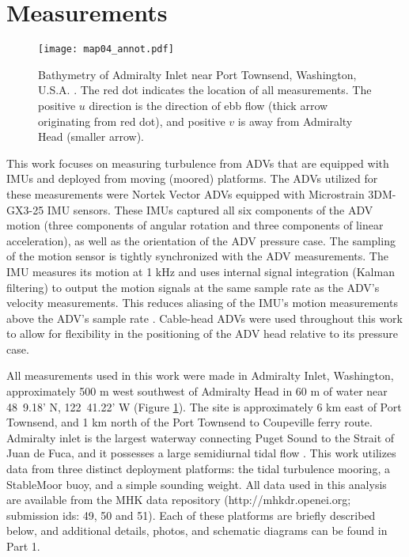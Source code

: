 
\section{Measurements}
\label{sec:meas}

\begin{figure}[t]
  \centering
  \texttt{[image: map04\_annot.pdf]}
  \caption{Bathymetry of Admiralty Inlet near Port Townsend, Washington, U.S.A. \cite[]{Finlayson2005}. The red dot indicates the location of all measurements. The positive $u$ direction is the direction of ebb flow (thick arrow originating from red dot), and positive $v$ is away from Admiralty Head (smaller arrow).}
  \label{fig:map}
\end{figure}

This work focuses on measuring turbulence from ADVs that are equipped with IMUs and deployed from moving (moored) platforms.
The ADVs utilized for these measurements were Nortek Vector ADVs equipped with Microstrain 3DM-GX3-25 IMU sensors. These IMUs captured all six components of the ADV motion (three components of angular rotation and three components of linear acceleration), as well as the orientation of the ADV pressure case. The sampling of the motion sensor is tightly synchronized with the ADV measurements. The IMU measures its motion at 1 kHz and uses internal signal integration (Kalman filtering) to output the motion signals at the same sample rate as the ADV's velocity measurements. This reduces aliasing of the IMU's motion measurements above the ADV's sample rate \cite[]{3DM-GX3_coning_sculling}. Cable-head ADVs were used throughout this work to allow for flexibility in the positioning of the ADV head relative to its pressure case.

All measurements used in this work were made in Admiralty Inlet, Washington, approximately 500 m west southwest of Admiralty Head in 60 m of water near 48\deg\ 9.18' N, 122\deg\ 41.22' W (Figure \ref{fig:map}). The site is approximately 6 km east of Port Townsend, and 1 km north of the Port Townsend to Coupeville ferry route.  Admiralty inlet is the largest waterway connecting Puget Sound to the Strait of Juan de Fuca, and it possesses a large semidiurnal tidal flow \cite[]{Thomson++2012, Polagye+Thomson2013}.  This work utilizes data from three distinct deployment platforms: the tidal turbulence mooring, a StableMoor buoy, and a simple sounding weight.  All data used in this analysis are available from the MHK data repository (http://mhkdr.openei.org; submission ids: 49, 50 and 51). Each of these platforms are briefly described below, and additional details, photos, and schematic diagrams can be found in Part 1.

